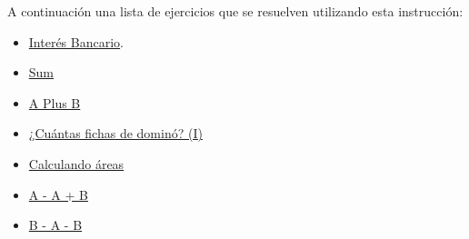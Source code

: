 A continuación una lista de ejercicios que se resuelven utilizando esta instrucción:

\begin{itemize}
	\item \href{https://dmoj.uclv.edu.cu/problem/bankint} {Interés Bancario}.
	\item \href{https://dmoj.uclv.edu.cu/problem/sum} {Sum}
	\item \href{https://dmoj.uclv.edu.cu/problem/aplusb} {A Plus B}
	\item \href{https://dmoj.uclv.edu.cu/problem/dominoes1}{¿Cuántas fichas de dominó? (I)}
	\item \href{https://dmoj.uclv.edu.cu/problem/calculandoareas}{Calculando áreas}
	\item \href{https://matcomgrader.com/problem/9607/a-b/}{A - A + B}
	\item \href{https://matcomgrader.com/problem/9608/a-b/}{B - A - B}
\end{itemize}